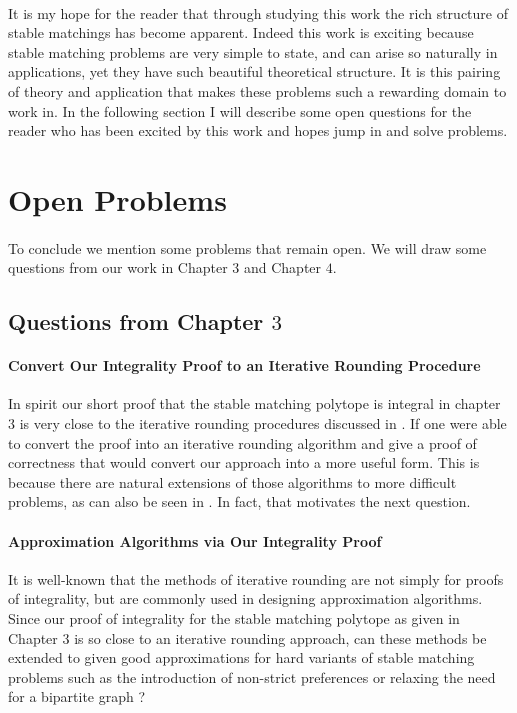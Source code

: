 \paragraph{}
It is my hope for the reader that through studying this work the rich structure of stable matchings has become apparent. Indeed this work is exciting because stable matching problems are very simple to state, and can arise so naturally in applications, yet they have such beautiful theoretical structure. It is this pairing of theory and application that makes these problems such a rewarding domain to work in. In the following section I will describe some open questions for the reader who has been excited by this work and hopes jump in and solve problems. 

\section{Open Problems}

\paragraph{}
To conclude we mention some problems that remain open. We will draw some questions from our work in Chapter $3$ and Chapter $4$.
\subsection{Questions from Chapter $3$}

\paragraph{Convert Our Integrality Proof to an Iterative Rounding Procedure}
In spirit our short proof that the stable matching polytope is integral in chapter 3 is very close to the iterative rounding procedures discussed in \cite{lau2011iterative}. If one were able to convert the proof into an iterative rounding algorithm and give a proof of correctness that would convert our approach into a more useful form. This is because there are natural extensions of those algorithms to more difficult problems, as can also be seen in \cite{lau2011iterative}. In fact, that motivates the next question.

\paragraph{Approximation Algorithms via Our Integrality Proof}
It is well-known that the methods of iterative rounding are not simply for proofs of integrality, but are commonly used in designing approximation algorithms\cite{lau2011iterative}. Since our proof of integrality for the stable matching polytope as given in Chapter $3$ is so close to an iterative rounding approach, can these methods be extended to given good approximations for hard variants of stable matching problems such as the introduction of non-strict preferences or relaxing the need for a bipartite graph \cite{iwama2008survey}?

